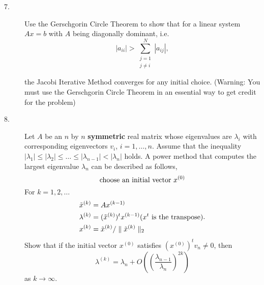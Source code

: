 \documentclass{article}
\begin{document}
\begin{description}
\item[7.]
Use the Gerschgorin Circle Theorem to show that for a linear system $Ax=b$
with $A$ being diagonally dominant, i.e.
$$|a_{ii}| > \sum^N_{\substack{ j=1 \\j \neq i}} |a_{ij}|,$$

the Jacobi Iterative Method converges for any initial choice. (Warning: You
must use the Gerschgorin Circle Theorem in an essential way to get credit
for the problem)

\item[8.]
Let $A$ be an $n$ by $n$ {\bf symmetric} real matrix whose eigenvalues are
$\lambda_i$ with corresponding eigenvectors $v_i$, $i=1, \dots, n$. Assume
that the inequality
$|\lambda_1| \leq |\lambda_2| \leq \dots \leq |\lambda_{n-1}| < |\lambda_n|$
holds. A power method that computes the largest eigenvalue $\lambda_n$
can be described as follows,
$$\hbox{choose\ } \hbox{an\ } \hbox{initial\ } \hbox{vector\ }
  x^{(0)}$$
For $k=1,2,\dots$
$$ \begin{aligned}
        \tilde x^{(k)} &= Ax^{(k-1)} \\
        \lambda^{(k)} &= (\tilde x^{(k)})^t x^{(k-1)} (x^t \hbox{\ is\ }
          \hbox{the\ } \hbox{transpose}) \\
        x^{(k)} &= \tilde x^{(k)} / \parallel \tilde x^{(k)} \parallel_2
        \end{aligned}.$$
Show that if the initial vector $x^{(0)}$ satisfies $(x^{(0)})^t v_n \neq 0$,
then
$$\lambda^{(k)} = \lambda_n + O \left( \left(
   \frac{\lambda_{n-1}}{\lambda_n} \right)^{2k} \right)$$
as $k \to \infty$.






\end{description}    
\end{document}
